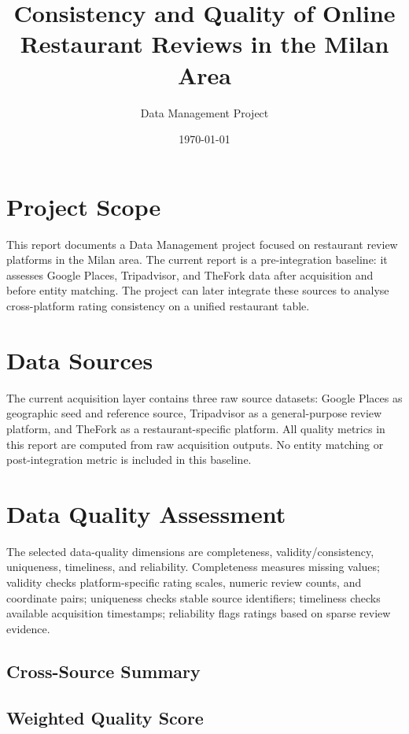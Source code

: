 \documentclass[11pt,a4paper]{article}
\title{Consistency and Quality of Online Restaurant Reviews in the Milan Area}
\author{Data Management Project}
\date{\today}
\begin{document}
\maketitle

\section{Project Scope}

This report documents a Data Management project focused on restaurant review
platforms in the Milan area. The current report is a pre-integration baseline:
it assesses Google Places, Tripadvisor, and TheFork data after acquisition and
before entity matching. The project can later integrate these sources to analyse
cross-platform rating consistency on a unified restaurant table.

\section{Data Sources}

The current acquisition layer contains three raw source datasets:
Google Places as geographic seed and reference source, Tripadvisor as a
general-purpose review platform, and TheFork as a restaurant-specific platform.
All quality metrics in this report are computed from raw acquisition outputs.
No entity matching or post-integration metric is included in this baseline.

\section{Data Quality Assessment}

The selected data-quality dimensions are completeness, validity/consistency,
uniqueness, timeliness, and reliability. Completeness measures missing values;
validity checks platform-specific rating scales, numeric review counts, and
coordinate pairs; uniqueness checks stable source identifiers; timeliness checks
available acquisition timestamps; reliability flags ratings based on sparse
review evidence.

\subsection{Cross-Source Summary}



\subsection{Weighted Quality Score}
\end{document}
